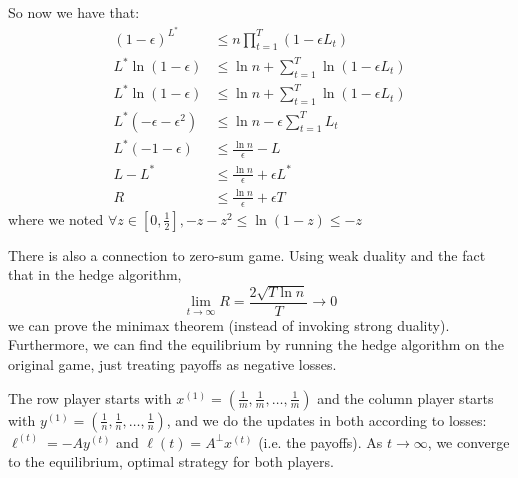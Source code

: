 \begin{theorem}
\begin{proof*}
        So now we have that:
        \begin{align*}
            (1 - \epsilon)^{L^*} &\leq n \prod_{t = 1}^T (1 - \epsilon L_t) \\
            L^* \ln(1 - \epsilon) &\leq \ln n + \sum_{t = 1}^T \ln(1 - \epsilon L_t) \\
            L^* \ln(1 - \epsilon) &\leq \ln n + \sum_{t = 1}^T \ln(1 - \epsilon L_t) \\
            L^* (- \epsilon - \epsilon^2) &\leq \ln n - \epsilon \sum_{t = 1}^T  L_t \\
            L^* (- 1 - \epsilon) &\leq \frac{\ln n}{\epsilon} - L \\
            L - L^* &\leq \frac{\ln n}{\epsilon} + \epsilon L^* \\
            R &\leq \frac{\ln n}{\epsilon} + \epsilon T
        \end{align*}
        where we noted $\forall z \in [0, \frac{1}{2}], -z - z^2 \leq \ln(1 - z) \leq - z$
    \end{proof*}
\end{theorem}

There is also a connection to zero-sum game. Using weak duality and the fact that in the hedge algorithm,
\[ \lim_{t \to \infty} R = \frac{2 \sqrt{T \ln n}}{T} \to 0 \]
we can prove the minimax theorem (instead of invoking strong duality). Furthermore, we can find the equilibrium by running
the hedge algorithm on the original game, just treating payoffs as negative losses.

\begin{algothm}
    The row player starts with $x^{(1)} = (\frac{1}{m}, \frac{1}{m}, \dots, \frac{1}{m})$ and the column
    player starts with $y^{(1)} = (\frac{1}{n}, \frac{1}{n}, \dots, \frac{1}{n})$, and we do the updates in both according to losses:
    $\ell^{(t)} = -Ay^{(t)}$ and $\ell{(t)} = A^{\perp} x^{(t)}$ (i.e. the payoffs). As $t \to \infty$, we converge to the equilibrium,
    optimal strategy for both players.
\end{algothm}

